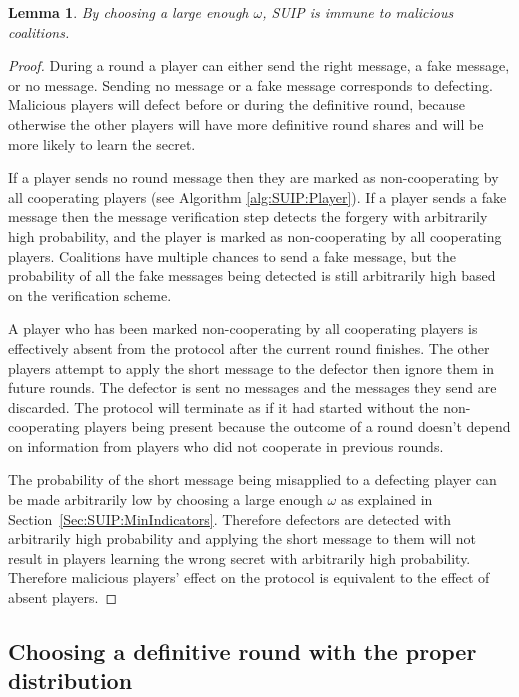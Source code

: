 \documentclass{dalcsthesis}
\newtheorem{lemma}{Lemma}
\begin{document}
\begin{lemma}\label{Lem:SUIP:MaliciousImmune}By choosing a large enough $\omega$, SUIP is immune to malicious coalitions.\end{lemma}
\begin{proof}
During a round a player can either send the right message, a fake message, or no message. Sending no message or a fake message corresponds to defecting. Malicious players will defect before or during the definitive round, because otherwise the other players will have more definitive round shares and will be more likely to learn the secret.

If a player sends no round message then they are marked as non-cooperating by all cooperating players (see Algorithm \ref{alg:SUIP:Player}). If a player sends a fake message then the message verification step detects the forgery with arbitrarily high probability, and the player is marked as non-cooperating by all cooperating players. Coalitions have multiple chances to send a fake message, but the probability of all the fake messages being detected is still arbitrarily high based on the verification scheme.

A player who has been marked non-cooperating by all cooperating players is effectively absent from the protocol after the current round finishes. The other players attempt to apply the short message to the defector then ignore them in future rounds. The defector is sent no messages and the messages they send are discarded. The protocol will terminate as if it had started without the non-cooperating players being present because the outcome of a round doesn't depend on information from players who did not cooperate in previous rounds.

The probability of the short message being misapplied to a defecting player can be made arbitrarily low by choosing a large enough $\omega$ as explained in Section~\ref{Sec:SUIP:MinIndicators}. Therefore defectors are detected with arbitrarily high probability and applying the short message to them will not result in players learning the wrong secret with arbitrarily high probability. Therefore malicious players' effect on the protocol is equivalent to the effect of absent players.
\end{proof}

\subsection{Choosing a definitive round with the proper distribution}
\label{Sec:SUIP:ChooseRound}
\end{document}
